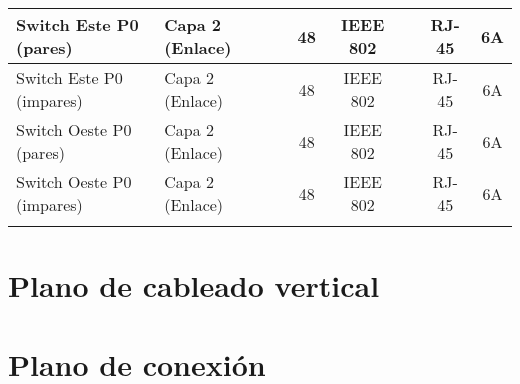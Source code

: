 \begin{table}[h]
{\begin{tabular}{|l|l|l|c|clcc}
Switch Este P0 (pares)            & Capa 2 (Enlace)           &                        & 48                                       & \multicolumn{1}{c|}{IEEE 802}          & \multicolumn{1}{l|}{}                       & \multicolumn{1}{c|}{RJ-45}                  & \multicolumn{1}{c|}{6A}                 \\ \hline
Switch Este P0 (impares)          & Capa 2 (Enlace)           &                        & 48                                       & \multicolumn{1}{c|}{IEEE 802}          & \multicolumn{1}{l|}{}                       & \multicolumn{1}{c|}{RJ-45}                  & \multicolumn{1}{c|}{6A}                 \\ \hline
Switch Oeste P0 (pares)           & Capa 2 (Enlace)           &                        & 48                                       & \multicolumn{1}{c|}{IEEE 802}          & \multicolumn{1}{l|}{}                       & \multicolumn{1}{c|}{RJ-45}                  & \multicolumn{1}{c|}{6A}                 \\ \hline
Switch Oeste P0 (impares)         & Capa 2 (Enlace)           &                        & 48                                       & \multicolumn{1}{c|}{IEEE 802}          & \multicolumn{1}{l|}{}                       & \multicolumn{1}{c|}{RJ-45}                  & \multicolumn{1}{c|}{6A}                 \\ \hline
                                  &                           &                        &                                          & \multicolumn{1}{l|}{}                  & \multicolumn{1}{l|}{}                       & \multicolumn{1}{c|}{}                       & \multicolumn{1}{c|}{}                   \\ \hline
\end{tabular}%
}
\end{table}
\section{Plano de cableado vertical}
\section{Plano de conexión}